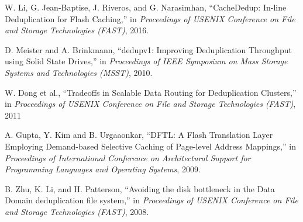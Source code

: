 \begin{thebibliography}{00}
W. Li, G. Jean-Baptise, J. Riveros, and G. Narasimhan, 
``CacheDedup: In-line Deduplication for Flash Caching,''
in \textit{Proceedings of USENIX Conference on File and Storage Technologies (FAST)}, 2016.

D. Meister and A. Brinkmann,
``dedupv1: Improving Deduplication Throughput using Solid State Drives,''
in \textit{Proceedings of IEEE Symposium on Mass Storage Systems and Technologies (MSST)}, 2010.

W. Dong et al.,
``Tradeoffs in Scalable Data Routing for Deduplication Clusters,''
in \textit{Proceedings of USENIX Conference on File and Storage Technologies (FAST)}, 2011


A. Gupta, Y. Kim and B. Urgaaonkar, 
``DFTL: A Flash Translation Layer Employing Demand-based Selective Caching of Page-level Address Mappings,''
in \textit{Proceedings of International Conference on Architectural Support for Programming Languages and
Operating Systems}, 2009.

B. Zhu, K. Li, and H. Patterson,
``Avoiding the disk bottleneck in the Data Domain deduplication file system,''
in \textit{Proceedings of USENIX Conference on File and Storage Technologies (FAST)}, 2008.



\end{thebibliography}
